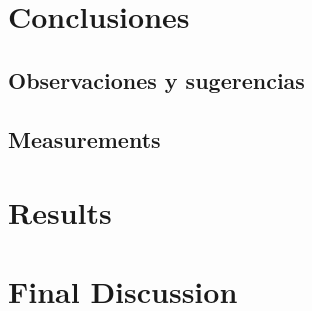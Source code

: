 \documentclass[a4paper,12pt]{article}
\begin{document}
\section{Conclusiones}

\subsection{Observaciones y sugerencias}

\subsection{Measurements}

\section{Results}

\section{Final Discussion}

\printbibliography
\end{document}
